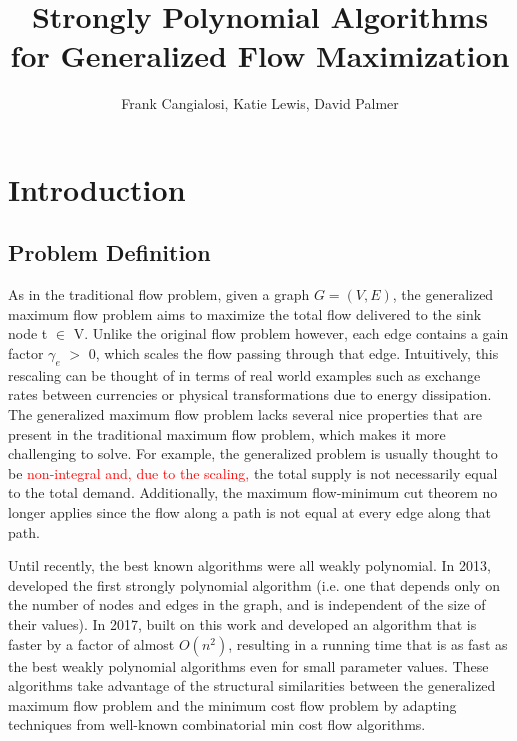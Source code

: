 \documentclass{article}
\title{Strongly Polynomial Algorithms for Generalized Flow Maximization}
\author{Frank Cangialosi, Katie Lewis, David Palmer}
\date{}
\newcommand{\rewrite}[1]{\textcolor{red}{#1}}
\begin{document}
\maketitle
\section{Introduction}
	\subsection{Problem Definition} As in the traditional flow problem, given a graph $G = (V,E)$, the generalized maximum flow problem aims to maximize the total flow delivered to the sink node t $\in$ V. Unlike the original flow problem however, each edge contains a gain factor $\gamma_e$ $>$ 0, which scales the flow passing through that edge. Intuitively, this rescaling can be thought of in terms of real world examples such as exchange rates between currencies or physical transformations due to energy dissipation. The generalized maximum flow problem lacks several nice properties that are present in the traditional maximum flow problem, which makes it more challenging to solve. For example, the generalized problem is usually thought to be \rewrite{non-integral and, due to the scaling,} the total supply is not necessarily equal to the total demand. Additionally, the maximum flow-minimum cut theorem no longer applies since the flow along a path is not equal at every edge along that path.
    
    Until recently, the best known algorithms were all weakly polynomial. In 2013, \cite{Vegh2013} developed the first strongly polynomial algorithm (i.e. one that depends only on the number of nodes and edges in the graph, and is independent of the size of their values). In 2017, \cite{Olver2017} built on this work and developed an algorithm that is faster by a factor of almost $O(n^2)$, resulting in a running time that is as fast as the best weakly polynomial algorithms even for small parameter values. These algorithms take advantage of the structural similarities between the generalized maximum flow problem and the minimum cost flow problem by adapting techniques from well-known combinatorial min cost flow algorithms. 
    
\end{document}
